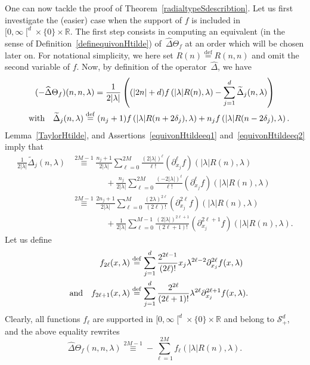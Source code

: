 \documentclass[11pt]{article}
\theoremstyle{definition}
\numberwithin{equation}{section}
\numberwithin{figure}{section}
\numberwithin{table}{section}
\newcommand{\lam}{\lambda}
\newcommand{\D}{\Delta}
\newcommand{\wt}{\widetilde}
\newcommand{\wh}{\widehat}
\newcommand*\cS{\mathcal{S}}
\newcommand*\R{\mathbb{R}}
\newcommand{\andf}{\quad\hbox{and}\quad}
\newcommand{\with}{\quad\hbox{with}\quad}
\newcommand*\eqdefa{\overset{\mathrm{def}}{=}}
\newcommand*\equivH[1]{\overset{#1}{\equiv}}
\renewcommand*{\cdotp}{.}
\begin{document}
One can now tackle the proof of Theorem~\ref{radialtypeSdescribtion}. Let us first investigate the (easier) case when the support of $f$ is included in~$[0,\infty\mathclose{[}^d\times\{0\}\times \R$. The first step consists in computing an equivalent (in the sense of Definition~\ref{definequivonHtilde}) of~$\wh\Delta\Theta_f$ at an order which will be chosen later on. For notational simplicity, we here set $R(n)\eqdefa R(n,n)$ and omit the second variable of $f$. Now, by definition of the operator~$\wh \D$, we have
\begin{multline}\label{radialSdescribtiondemoeq0}
(-\wh \Delta \Theta_f)(n,n,\lam) = \frac 1 {2 |\lam|} \left((|2n| +d) f\left (|\lam|R(n),\lam\right) -\sum_{j=1}^d \wt \D_j (n,\lam)\right)\\ \with \wt \D_j (n,\lam) \eqdefa (n_j+1)f \left(|\lam|R(n+2\delta_j),\lam\right) +n_j f \left(|\lam|R(n-2\delta_j),\lam\right).
\end{multline}
Lemma~\ref{TaylorHtilde}, and Assertions~\eqref{equivonHtildeeq1} and~\eqref{equivonHtildeeq2} imply that
\[
\begin{aligned}
\frac 1 {2|\lam|} \wt \D_j (n,\lam) &\equivH {2M-1} \frac {n_j+1} {2|\lam|}
\sum_{\ell=0} ^{2M} \frac {(2|\lam|)^\ell } {\ell!} (\partial_{x_j}^\ell f)(|\lam|R(n),\lam)\\
&\qquad\qquad {}+\frac {n_j} {2|\lam|} \sum_{\ell=0} ^{2M} \frac { (-2|\lam|)^\ell } {\ell!} (\partial_{x_j}^\ell f)(|\lam|R(n),\lam)\\
&\equivH {2M-1} \frac {2n_j+1} {2|\lam|} \sum_{\ell=0} ^{M} \frac {(2\lam)^{2\ell}} {(2\ell)!} (\partial_{x_j}^{2\ell} f)(|\lam|R(n),\lam)\\
&\qquad\qquad {}+\frac {1} {2|\lam|}
\sum_{\ell=0} ^{M-1} \frac {(2|\lam|)^{2\ell+1} } {(2\ell+1)!} (\partial_{x_j}^{2\ell+1} f)(|\lam|R(n),\lam).
\end{aligned}
\]
Let us define
\[
\begin{aligned}
f_{2\ell} (x,\lam) &\eqdefa \sum_{j=1}^d \frac {2^{2\ell-1}} {(2\ell)!} x_j\lam^{2\ell-2} \partial_{x_j}^{2\ell} f(x, \lam)\\ \andf
f_{2\ell+1} (x,\lam) &\eqdefa \sum_{j=1}^d \frac {2^{2\ell}} {(2\ell+1)!} \lam^{2\ell} \partial^{2\ell+1}_{x_j} f(x, \lam).
\end{aligned}
\]
Clearly, all functions $f_\ell$ are supported in $[0,\infty\mathclose{[}^d\times\{0\}\times\R$ and belong to $\cS^d_+$, and the above equality rewrites
\begin{equation}\label{radialSdescribtiondemoeq2}
\wh \Delta \Theta_f (n,n,\lam) \equivH {2M-1} - \sum_{\ell=1}^{2M} f_\ell \left(|\lam|R(n),\lam\right)\cdotp
\end{equation}
\end{document}
